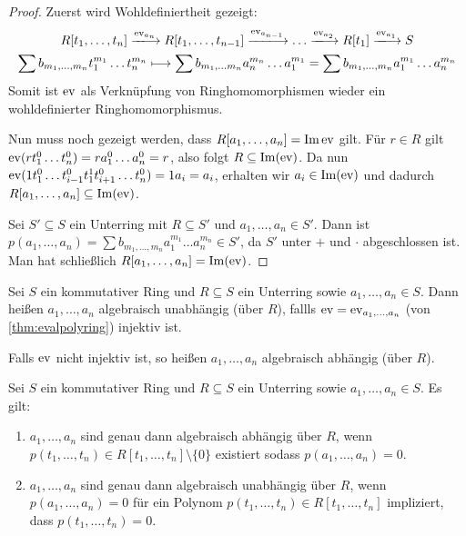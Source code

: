 \documentclass[12pt,a4paper]{scrartcl}
\begin{document}
\begin{proof}
		Zuerst wird Wohldefiniertheit gezeigt:
		\begin{equation*}
		\begin{gathered}
			R[t_1,\dots, t_n]\xlongrightarrow{\ev_{a_n}} R[t_1,\dots, t_{n-1}]\xlongrightarrow{\ev_{a_{n-1}}}\dots \xlongrightarrow{\ev_{a_2}}R[t_1]\xlongrightarrow{\ev_{a_1}} S \\
			\sum b_{m_1,\dots, m_n}t_1^{m_1}\dots t_n^{m_n}\longmapsto \sum b_{m_1,\dots m_n} a_n^{m_n}\dots a_1^{m_1} = \sum b_{m_1,\dots, m_n}a_1^{m_1}\dots a_n^{m_n}
		\end{gathered}
		\end{equation*}
		Somit ist $\operatorname{ev}$ als Verknüpfung von Ringhomomorphismen wieder ein wohldefinierter Ringhomomorphismus.
		
		Nun muss noch gezeigt werden, dass $R\lbrack a_1,\dots,a_n\rbrack = \operatorname{Im} \operatorname{ev}$ gilt. Für $r\in R$ gilt $\operatorname{ev}(rt_1^0\dots t_n^0) = ra_1^0\dots a_n^0 = r$, also folgt $R\subseteq \operatorname{Im} (\operatorname{ev})$.
		Da nun $\operatorname{ev}(1t_1^0\dots t_{i-1}^0t_1^1t_{i+1}^0\dots t_n^0) = 1a_i = a_i$, erhalten wir $a_i\in\operatorname{Im} (\operatorname{ev})$ und dadurch $R[a_1,\dots, a_n]\subseteq \operatorname{Im}(\operatorname{ev})$.
		
		Sei $S'\subseteq S$ ein Unterring mit $R\subseteq S'$ und $a_1,\dots, a_n\in S'$. Dann ist $p(a_1,\dots,a_n) = \sum b_{m_1,\dots,m_n}a_1^{m_1}\dots a_n^{m_n}\in S'$, da $S'$ unter $+$ und $\cdot$ abgeschlossen ist. Man hat schließlich $R[a_1,\dots,a_n] = \operatorname{Im} (\operatorname{ev})$.
\end{proof}

\begin{defi}
	Sei $S$ ein kommutativer Ring und $R\subseteq S$ ein Unterring sowie $a_1,\dots, a_n\in S$. Dann heißen $a_1,\dots,a_n$ algebraisch unabhängig (über $R$), fallls $\operatorname{ev} = \operatorname{ev}_{a_1,\dots, a_n}$ (von \cref{thm:evalpolyring}) injektiv ist.
	
	Falls $\operatorname{ev}$ nicht injektiv ist, so heißen $a_1,\dots, a_n$ algebraisch abhängig (über $R$).
\end{defi}

\begin{lem}
	Sei $S$ ein kommutativer Ring und $R\subseteq S$ ein Unterring sowie $a_1,\dots, a_n\in S$. Es gilt:
	\begin{enumerate}
		\item $a_1,\dots,a_n$ sind genau dann algebraisch abhängig über $R$, wenn $p(t_1,\dots,t_n)\in R[t_1,\dots,t_n]\setminus\{0\}$ existiert sodass $p(a_1,\dots,a_n) = 0$.
		\item $a_1,\dots, a_n$ sind genau dann algebraisch unabhängig über $R$, wenn $p(a_1,\dots,a_n) = 0$ für ein Polynom $p(t_1,\dots, t_n)\in R[t_1,\dots,t_n]$ impliziert, dass $p(t_1,\dots, t_n) = 0$.
	\end{enumerate}
\end{lem}
\end{document}
